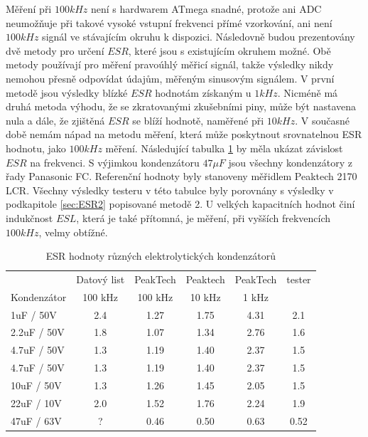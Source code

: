 Měření při \(100kHz\) není s hardwarem ATmega snadné, protože ani ADC neumožňuje při takové vysoké vstupní frekvenci přímé vzorkování, ani není \(100kHz\) signál ve stávajícím okruhu k dispozici.
Následovně budou prezentovány dvě metody pro určení  \(ESR\), které jsou s existujícím okruhem možné.
Obě metody používají  pro měření pravoúhlý měřicí signál, takže výsledky nikdy nemohou
přesně odpovídat údajům, měřeným sinusovým signálem.
V první metodě jsou výsledky blízké \(ESR\) hodnotám získaným u \(1kHz\).
Nicméně má druhá metoda výhodu, že se zkratovanými zkušebními piny, může být nastavena nula a dále, že zjištěná  \(ESR\) se blíží hodnotě, naměřené při \(10kHz\).
V současné době nemám nápad na metodu měření, která může poskytnout srovnatelnou ESR hodnotu,
jako \(100kHz\)  měření.
Následující tabulka \ref{tab:capESR} by měla ukázat závislost \(ESR\) na frekvenci.
S výjimkou kondenzátoru \(47\mu F\) jsou všechny kondenzátory z řady Panasonic FC.
Referenční hodnoty byly stanoveny měřidlem Peaktech 2170 LCR.
Všechny výsledky testeru v této tabulce byly porovnány s výsledky v podkapitole \ref{sec:ESR2} popisované metodě 2.
U velkých kapacitních hodnot činí indukčnost \(ESL\), která je také přítomná, je měření,
při vyšších frekvencích \(100kHz\), velmy obtížné.


\begin{table}[H]
  \begin{center}
    \begin{tabular}{| l | c | c | c | c | c |}
   \hline
            & Datový list & PeakTech  & Peaktech & PeakTech & tester \\
Kondenzátor & 100 kHz    & 100 kHz   & 10 kHz   & 1 kHz    &   \\
    \hline
    \hline
1uF / 50V    & 2.4       & 1.27      & 1.75     & 4.31     &  2.1 \\
    \hline
2.2uF / 50V  & 1.8       & 1.07      & 1.34     & 2.76     &  1.6 \\
    \hline
4.7uF / 50V  & 1.3       & 1.19      & 1.40     & 2.37     &  1.5 \\
    \hline
4.7uF / 50V  & 1.3       & 1.19      & 1.40     & 2.37     &  1.5 \\
    \hline
10uF / 50V   & 1.3       & 1.26      & 1.45     & 2.05     &  1.5 \\
    \hline
22uF / 10V   & 2.0       & 1.52      & 1.76     & 2.24     &  1.9 \\
    \hline
47uF / 63V   & ?         & 0.46      & 0.50     & 0.63     &  0.52 \\
    \hline
    \end{tabular}
  \end{center}
  \caption{ESR hodnoty různých elektrolytických kondenzátorů}
  \label{tab:capESR} 
\end{table}


